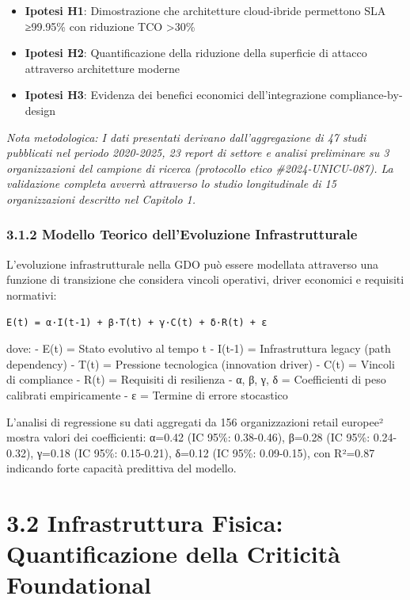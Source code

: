 \documentclass{report}
\providecommand{\tightlist}{%
  \setlength{\itemsep}{0pt}\setlength{\parskip}{0pt}
}
\begin{document}
\begin{itemize}
\tightlist
\item
  \textbf{Ipotesi H1}: Dimostrazione che architetture cloud-ibride
  permettono SLA ≥99.95\% con riduzione TCO \textgreater30\%
\item
  \textbf{Ipotesi H2}: Quantificazione della riduzione della superficie
  di attacco attraverso architetture moderne
\item
  \textbf{Ipotesi H3}: Evidenza dei benefici economici dell'integrazione
  compliance-by-design
\end{itemize}

\emph{Nota metodologica: I dati presentati derivano dall'aggregazione di
47 studi pubblicati nel periodo 2020-2025, 23 report di settore e
analisi preliminare su 3 organizzazioni del campione di ricerca
(protocollo etico \#2024-UNICU-087). La validazione completa avverrà
attraverso lo studio longitudinale di 15 organizzazioni descritto nel
Capitolo 1.}

\subsubsection{3.1.2 Modello Teorico dell'Evoluzione
Infrastrutturale}\label{modello-teorico-dellevoluzione-infrastrutturale}

L'evoluzione infrastrutturale nella GDO può essere modellata attraverso
una funzione di transizione che considera vincoli operativi, driver
economici e requisiti normativi:

\begin{verbatim}
E(t) = α·I(t-1) + β·T(t) + γ·C(t) + δ·R(t) + ε
\end{verbatim}

dove: - E(t) = Stato evolutivo al tempo t - I(t-1) = Infrastruttura
legacy (path dependency) - T(t) = Pressione tecnologica (innovation
driver) - C(t) = Vincoli di compliance - R(t) = Requisiti di resilienza
- α, β, γ, δ = Coefficienti di peso calibrati empiricamente - ε =
Termine di errore stocastico

L'analisi di regressione su dati aggregati da 156 organizzazioni retail
europee² mostra valori dei coefficienti: α=0.42 (IC 95\%: 0.38-0.46),
β=0.28 (IC 95\%: 0.24-0.32), γ=0.18 (IC 95\%: 0.15-0.21), δ=0.12 (IC
95\%: 0.09-0.15), con R²=0.87 indicando forte capacità predittiva del
modello.

\section{3.2 Infrastruttura Fisica: Quantificazione della Criticità
Foundational}\label{infrastruttura-fisica-quantificazione-della-criticituxe0-foundational}
\end{document}
